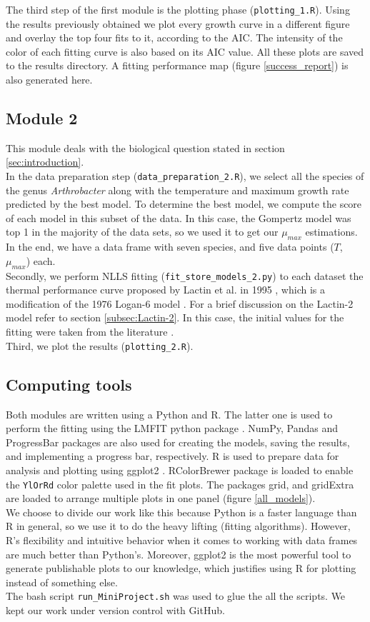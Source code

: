 \documentclass[titlepage,11pt]{article}
\begin{document}
\begin{linenumbers}
	The third step of the first module is the plotting phase (\verb|plotting_1.R|). Using the results previously obtained we plot every growth curve in a different figure and overlay the top four fits to it, according to the AIC. The intensity of the color of each fitting curve is also based on its AIC value. All these plots are saved to the results directory. A fitting performance map (figure \ref{success_report}) is also generated here.
	\subsection{Module 2}
	This module deals with the biological question stated in section \ref{sec:introduction}. \\
	In the data preparation step (\verb|data_preparation_2.R|), we select all the species of the genus \textit{Arthrobacter} along with the temperature and maximum growth rate predicted by the best model. To determine the best model, we compute the score of each model in this subset of the data. In this case, the Gompertz model was top 1 in the majority of the data sets, so we used it to get our $ \mu_{max} $ estimations. In the end, we have a data frame with seven species, and five data points ($ T $, $ \mu_{max} $) each. \\
	Secondly, we perform NLLS fitting (\verb|fit_store_models_2.py|) to each dataset the thermal performance curve proposed by Lactin et al. in 1995 \cite{Lactin1995}, which is a modification of the 1976 Logan-6 model \cite{Logan1976}. For a brief discussion on the Lactin-2 model refer to section \ref{subsec:Lactin-2}. In this case, the initial values for the fitting were taken from the literature \cite{Lactin1995}.\\
	Third, we plot the results (\verb|plotting_2.R|).
	\subsection{Computing tools}
	Both modules are written using a Python and R. The latter one is used to perform the fitting using the LMFIT python package \cite{Newville2014}. NumPy, Pandas \cite{Virtanen2020} and ProgressBar packages are also used for creating the models, saving the results, and implementing a progress bar, respectively. R is used to prepare data for analysis and plotting using ggplot2 \cite{Wickham2016}. RColorBrewer package is loaded to enable the \verb|YlOrRd| color palette used in the fit plots. The packages grid, and gridExtra are loaded to arrange multiple plots in one panel (figure \ref{all_models}).\\
	We choose to divide our work like this because Python is a faster language than R in general, so we use it to do the heavy lifting (fitting algorithms). However, R's flexibility and intuitive behavior when it comes to working with data frames are much better than Python's. Moreover, ggplot2 is the most powerful tool to generate publishable plots to our knowledge, which justifies using R for plotting instead of something else.\\
	The bash script \verb|run_MiniProject.sh| was used to glue the all the scripts. We kept our work under version control with GitHub.
	

\end{linenumbers}
\end{document}
